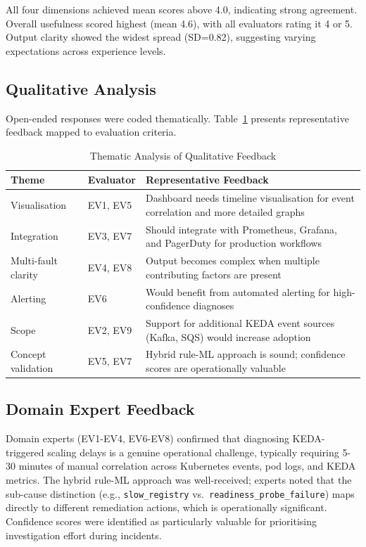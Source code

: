 All four dimensions achieved mean scores above 4.0, indicating strong agreement. Overall usefulness scored highest (mean 4.6), with all evaluators rating it 4 or 5. Output clarity showed the widest spread (SD=0.82), suggesting varying expectations across experience levels.

\subsection{Qualitative Analysis}
Open-ended responses were coded thematically. Table~\ref{tab:qualitative_feedback} presents representative feedback mapped to evaluation criteria.

\begin{table}[H]
\centering
\small
\begin{tabularx}{\textwidth}{|l|l|X|}
\hline
\textbf{Theme} & \textbf{Evaluator} & \textbf{Representative Feedback} \\ \hline
Visualisation & EV1, EV5 & Dashboard needs timeline visualisation for event correlation and more detailed graphs \\ \hline
Integration & EV3, EV7 & Should integrate with Prometheus, Grafana, and PagerDuty for production workflows \\ \hline
Multi-fault clarity & EV4, EV8 & Output becomes complex when multiple contributing factors are present \\ \hline
Alerting & EV6 & Would benefit from automated alerting for high-confidence diagnoses \\ \hline
Scope & EV2, EV9 & Support for additional KEDA event sources (Kafka, SQS) would increase adoption \\ \hline
Concept validation & EV5, EV7 & Hybrid rule-ML approach is sound; confidence scores are operationally valuable \\ \hline
\end{tabularx}
\caption{Thematic Analysis of Qualitative Feedback}
\label{tab:qualitative_feedback}
\end{table}

\subsection{Domain Expert Feedback}
Domain experts (EV1-EV4, EV6-EV8) confirmed that diagnosing KEDA-triggered scaling delays is a genuine operational challenge, typically requiring 5-30 minutes of manual correlation across Kubernetes events, pod logs, and KEDA metrics. The hybrid rule-ML approach was well-received; experts noted that the sub-cause distinction (e.g., \texttt{slow\_registry} vs.\ \texttt{readiness\_probe\_failure}) maps directly to different remediation actions, which is operationally significant. Confidence scores were identified as particularly valuable for prioritising investigation effort during incidents.

